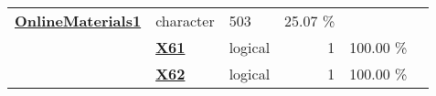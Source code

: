 \documentclass[]{article}
\begin{document}
\begin{longtable}[]{@{}lllrcl@{}}
\begin{minipage}[t]{0.35\columnwidth}
\textbf{\protect\hyperlink{onlinematerials1}{OnlineMaterials1}}\strut
\end{minipage} & \begin{minipage}[t]{0.11\columnwidth}\raggedright\strut
character\strut
\end{minipage} & \begin{minipage}[t]{0.10\columnwidth}\raggedleft\strut
503\strut
\end{minipage} & \begin{minipage}[t]{0.10\columnwidth}\centering\strut
25.07 \%\strut
\end{minipage} & \begin{minipage}[t]{0.12\columnwidth}\raggedright\strut
\strut
\end{minipage}\tabularnewline
\begin{minipage}[t]{0.07\columnwidth}\raggedright\strut
\strut
\end{minipage} & \begin{minipage}[t]{0.35\columnwidth}\raggedright\strut
\textbf{\protect\hyperlink{x61}{X61}}\strut
\end{minipage} & \begin{minipage}[t]{0.11\columnwidth}\raggedright\strut
logical\strut
\end{minipage} & \begin{minipage}[t]{0.10\columnwidth}\raggedleft\strut
1\strut
\end{minipage} & \begin{minipage}[t]{0.10\columnwidth}\centering\strut
100.00 \%\strut
\end{minipage} & \begin{minipage}[t]{0.12\columnwidth}\raggedright\strut
\strut
\end{minipage}\tabularnewline
\begin{minipage}[t]{0.07\columnwidth}\raggedright\strut
\strut
\end{minipage} & \begin{minipage}[t]{0.35\columnwidth}\raggedright\strut
\textbf{\protect\hyperlink{x62}{X62}}\strut
\end{minipage} & \begin{minipage}[t]{0.11\columnwidth}\raggedright\strut
logical\strut
\end{minipage} & \begin{minipage}[t]{0.10\columnwidth}\raggedleft\strut
1\strut
\end{minipage} & \begin{minipage}[t]{0.10\columnwidth}\centering\strut
100.00 \%\strut

\end{minipage}
\end{longtable}
\end{document}

